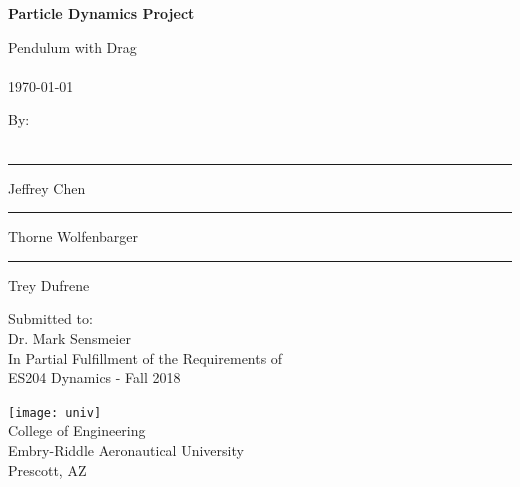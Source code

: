 \begin{titlepage}
  \begin{center}
      \vspace*{1cm}

      \Large
      \textbf{Particle Dynamics Project}

      \vspace{0.5cm}
      \large
      Pendulum with Drag \\
      ~\\
      \normalsize \today

      \vspace{1.5cm}

      \large
      By: \\
      ~\\
      \normalsize
      \vspace{4ex}
      \begin{multicols}{3}
        \hrule
        \vspace{3ex}
        Jeffrey Chen
        \vfill\null
        \columnbreak
        \hrule
        \vspace{3ex}
        Thorne Wolfenbarger
        \vfill\null
        \columnbreak
        \hrule
        \vspace{3ex}
        Trey Dufrene
        \vfill\null
        \columnbreak
      \end{multicols}
      \vfill

      \vspace{0.8cm}

      \large
      Submitted to: \\
      Dr. Mark Sensmeier \\
      In Partial Fulfillment of the Requirements of \\
      ES204 Dynamics - Fall 2018\\

      \vspace{0.8cm}

      \texttt{[image: univ]}
      ~\\
      College of Engineering\\
      Embry-Riddle Aeronautical University\\
      Prescott, AZ\\

  \end{center}
\end{titlepage}
